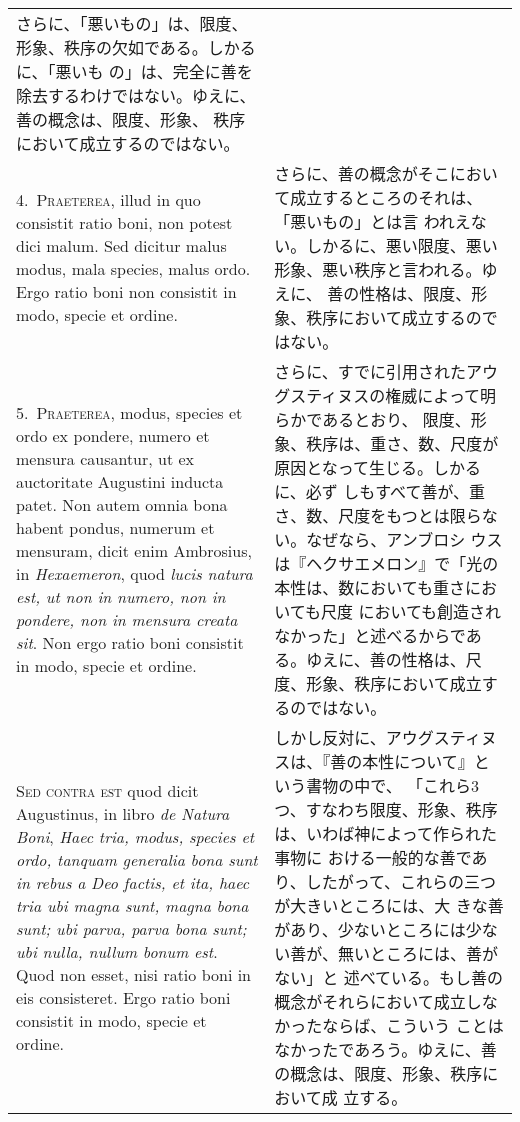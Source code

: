 \documentclass[10pt]{jsarticle}
\begin{document}
\begin{longtable}{p{21em}p{21em}}
さらに、「悪いもの」は、限度、形象、秩序の欠如である。しかるに、「悪いも
 の」は、完全に善を除去するわけではない。ゆえに、善の概念は、限度、形象、
 秩序において成立するのではない。

\\


4.~{\scshape Praeterea}, illud in quo consistit ratio boni, non potest dici
 malum. Sed dicitur malus modus, mala species, malus ordo. Ergo ratio
 boni non consistit in modo, specie et ordine.

&

さらに、善の概念がそこにおいて成立するところのそれは、「悪いもの」とは言
 われえない。しかるに、悪い限度、悪い形象、悪い秩序と言われる。ゆえに、
 善の性格は、限度、形象、秩序において成立するのではない。

\\


5.~{\scshape Praeterea}, modus, species et ordo ex pondere, numero et
 mensura causantur, ut ex auctoritate Augustini inducta patet. Non autem
 omnia bona habent pondus, numerum et mensuram, dicit enim Ambrosius, in
 {\itshape Hexaemeron}, quod {\itshape lucis natura est, ut non in
 numero, non in pondere, non in mensura creata sit}. Non ergo ratio boni
 consistit in modo, specie et ordine.

&


さらに、すでに引用されたアウグスティヌスの権威によって明らかであるとおり、
 限度、形象、秩序は、重さ、数、尺度が原因となって生じる。しかるに、必ず
 しもすべて善が、重さ、数、尺度をもつとは限らない。なぜなら、アンブロシ
 ウスは『ヘクサエメロン』で「光の本性は、数においても重さにおいても尺度
 においても創造されなかった」と述べるからである。ゆえに、善の性格は、尺
 度、形象、秩序において成立するのではない。



\\

{\scshape Sed contra est} quod dicit Augustinus, in libro {\itshape de
 Natura Boni}, {\itshape Haec tria, modus, species et ordo, tanquam
 generalia bona sunt in rebus a Deo factis, et ita, haec tria ubi magna
 sunt, magna bona sunt; ubi parva, parva bona sunt; ubi nulla, nullum
 bonum est}. Quod non esset, nisi ratio boni in eis consisteret. Ergo
 ratio boni consistit in modo, specie et ordine.

&

しかし反対に、アウグスティヌスは、『善の本性について』という書物の中で、
 「これら3つ、すなわち限度、形象、秩序は、いわば神によって作られた事物に
 おける一般的な善であり、したがって、これらの三つが大きいところには、大
 きな善があり、少ないところには少ない善が、無いところには、善がない」と
 述べている。もし善の概念がそれらにおいて成立しなかったならば、こういう
 ことはなかったであろう。ゆえに、善の概念は、限度、形象、秩序において成
 立する。


\end{longtable}
\end{document}
